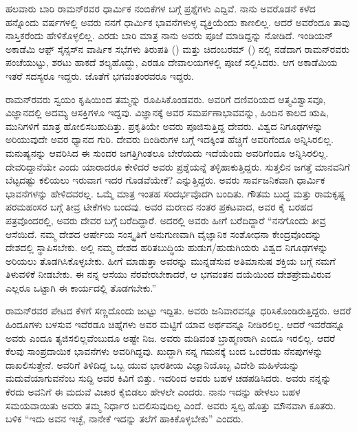 
ಹಲವಾರು ಬಾರಿ ರಾಮನ್‍ರವರ ಧಾರ್ಮಿಕ ನಂಬಿಕೆಗಳ ಬಗ್ಗೆ ಪ್ರಶ್ನೆಗಳು ಎದ್ದಿವೆ. ನಾನು ಅವರೊಡನೆ ಕಳೆದ ಹನ್ನೊಂದು ವರ್ಷಗಳಲ್ಲಿ ಅವರು ನನಗೆ ಧಾರ್ಮಿಕ ಭಾವನೆಗಳುಳ್ಳ ವ್ಯಕ್ತಿಯೆಂದು ಕಾಣಲಿಲ್ಲ. ಆದರೆ ಅವರೆಂದೂ ತಾವು ನಾಸ್ತಿಕರೆಂದು ಹೇಳಿಕೊಳ್ಳಲಿಲ್ಲ. ಎರಡು ಬಾರಿ ಮಾತ್ರ ನಾನು ಅವರು ಪೂಜೆ ಮಾಡಿದ್ದನ್ನು ನೋಡಿದೆ. ಇಂಡಿಯನ್ ಅಕಾಡೆಮಿ ಆಫ಼್ ಸೈನ್ಸಸ್‍ನ ವಾರ್ಷಿಕ ಸಭೆಗಳು ತಿರುಪತಿ () ಮತ್ತು ಚಿದಂಬರಮ್ () ನಲ್ಲಿ ನಡೆದಾಗ ರಾಮನ್‍ರವರು ಪಂಚೆಯುಟ್ಟು, ಶರಟು ಹಾಕದೆ ಶಲ್ಯಹೊದ್ದು, ಎರಡೂ ದೇವಾಲಯಗಳಲ್ಲಿ ಪೂಜೆ ಸಲ್ಲಿಸಿದರು. ಆಗ ಅಕಾಡೆಮಿಯ ಇತರೆ ಸದಸ್ಯರೂ ಇದ್ದರು. ಜೊತೆಗೆ ಭಗವಂತಂರವರೂ ಇದ್ದರು.

ರಾಮನ್‍ರವರು ಸ್ವಯಂ ಕೃಷಿಯಿಂದ ತಮ್ಮನ್ನು ರೂಪಿಸಿಕೊಂಡವರು. ಅವರಿಗೆ ದಣಿವರಿಯದ ಆತ್ಮವಿಶ್ವಾಸವೂ, ವಿಜ್ಞಾನದಲ್ಲಿ ಅದಮ್ಯ ಆಸಕ್ತಿಗಳೂ ಇದ್ದವು. ವಿಜ್ಞಾನಕ್ಕೆ ಅವರ ಸಮರ್ಪಣಾಭಾವವನ್ನು, ಹಿಂದಿನ ಕಾಲದ ಋಷಿ, ಮುನಿಗಳಿಗೆ ಮಾತ್ರ ಹೋಲಿಸಬಹುದಿತ್ತು. ಪ್ರಕೃತಿಯೇ ಅವರು ಪೂಜಿಸುತ್ತಿದ್ದ ದೇವರು. ವಿಶ್ವದ ನಿಗೂಢಗಳನ್ನು ಅರಿಯುವುದೇ ಅವರ ಧ್ಯಾನದ ಗುರಿ. ದೇವರು ದಿಂಡಿರುಗಳ ಬಗ್ಗೆ ಇದಕ್ಕಿಂತ ಹೆಚ್ಚಿಗೆ ಅವರಿಗೆಂದೂ ಅನ್ನಿಸಿರಲಿಲ್ಲ. ಮನುಷ್ಯನನ್ನು ಆವರಿಸಿದ ಈ ಸುಂದರ ಜಗತ್ತಿಗಿಂತಲೂ ಬೇರೆಯದು ಇದೆಯೆಂದು ಅವರಿಗೆಂದೂ ಅನ್ನಿಸಿರಲಿಲ್ಲ. ದೇವರಿದ್ದಾನೆಯೇ ಎಂದು ಯಾರಾದರೂ ಕೇಳಿದರೆ ಅವರು ಪ್ರಶ್ನೆಯನ್ನೆ ತಳ್ಳಿಹಾಕುತ್ತಿದ್ದರು. ಸುತ್ತಲಿನ ಜಗತ್ತೆ ಮಾನವನಿಗೆ ಬೆಟ್ಟದಷ್ಟು ಕಲಿಯಲು ಇರುವಾಗ ಇದರ ಗೊಡವೆಯೇಕೆ? ಎನ್ನುತ್ತಿದ್ದರು. ಅವರು ಸಾರ್ವಜನಿಕವಾಗಿ ಧಾರ್ಮಿಕ ಭಾವನೆಗಳನ್ನು ಹೇಳಿದವರಲ್ಲ. ಒಮ್ಮೆ ಮಾತ್ರ ಇಂತಹ ಸಂದರ್ಭವೊದಗಿ ಬಂದಿತು. ಗೌತಮ ಬುದ್ಧ ಮತ್ತು ರಾಮಕೃಷ್ಣ ಪರಮಹಂಸರ ಬಗ್ಗೆ ತೀವ್ರ ಟೀಕೆಗಳು ಬಂದವು. ಅವರ ಮರಣದ ನಂತರ ಪ್ರಕಟವಾದ, ಅವರ ಕೈ ಬರಹದ ಪತ್ರವೊಂದರಲ್ಲಿ, ಅವರು ದೇವರ ಬಗ್ಗೆ ಬರೆದಿದ್ದಾರೆ. ಅದರಲ್ಲಿ ಅವರು ಹೀಗೆ ಬರೆದಿದ್ದಾರೆ\enginline{--} “ನನಗೊಂದು ತೀವ್ರ ಆಸೆಯಿದೆ. ನಮ್ಮ ದೇಶದ ಆರ್ಷೇಯ ಸಂಸ್ಕೃತಿಗೆ ಅನುಗುಣವಾಗಿ ವೈಜ್ಞಾನಿಕ ಸಂಶೋಧನಾ ಕೇಂದ್ರವೊಂದನ್ನು ದೇಶದಲ್ಲಿ ಸ್ಥಾಪಿಸಬೇಕು. ಅಲ್ಲಿ ನಮ್ಮ ದೇಶದ ಹರಿತಬುದ್ಧಿಯ ಹುಡುಗ/ಹುಡುಗಿಯರು ವಿಶ್ವದ ನಿಗೂಢಗಳನ್ನು ಅರಿಯಲು ತೊಡಗಿಸಿಕೊಳ್ಳಬೇಕು. ಹೀಗೆ ಮಾಡುತ್ತಾ ಅವರನ್ನು ಮುನ್ನಡೆಸುವ ಅತಿಮಾನುಷ ಶಕ್ತಿಯ ಬಗ್ಗೆ ನಮಗೆ ತಿಳುವಳಿಕೆ ನೀಡಬೇಕು. ಈ ನನ್ನ ಆಸೆಯು ನೆರವೇರಬೇಕಾದರೆ, ಆ ಭಗವಂತನ ದಯೆಯಿಂದ ದೇಶಪ್ರೇಮವಿರುವ ಎಲ್ಲರೂ ಒಟ್ಟಾಗಿ ಈ ಕಾರ್ಯದಲ್ಲಿ ತೊಡಗಬೇಕು.”

ರಾಮನ್‍ರವರ ಪೇಟದ ಕೆಳಗೆ ಸಣ್ಣದೊಂದು ಜುಟ್ಟು ಇದ್ದಿತು. ಅವರು ಜನಿವಾರವನ್ನೂ ಧರಿಸಿಕೊಂಡಿರುತ್ತಿದ್ದರು. ಆದರೆ ಹಿಂದೂಗಳು ಬಳಸುವ ಇವೆರಡೂ ಚಿಹ್ನೆಗಳು ಅವರ ಮಟ್ಟಿಗೆ ಯಾವ ಅರ್ಥವನ್ನೂ ನೀಡಿರಲಿಲ್ಲ. ಆದರೆ ಇವರೆಡನ್ನೂ ಅವರು ಎಂದೂ ತ್ಯಜಿಸಲಿಲ್ಲವೆಂಬುದೂ ಅಷ್ಟೇ ನಿಜ. ಅವರು ಮಡಿವಂತ ಬ್ರಾಹ್ಮಣರಾಗಿ ಎಂದೂ ಇರಲಿಲ್ಲ. ಆದರೆ ಕೆಲವು ಸಾಂಪ್ರದಾಯಿಕ ಭಾವನೆಗಳು ಅವರಿಗಿದ್ದವು. ಖುದ್ದಾಗಿ ನನ್ನ ಗಮನಕ್ಕೆ ಬಂದ ಒಂದೆರಡು ನೆನಪುಗಳನ್ನು ದಾಖಲಿಸುತ್ತೇನೆ. ಅವರಿಗೆ ತಿಳಿದಿದ್ದ ಒಬ್ಬ ಯುವ ಭಾರತೀಯ ವಿಜ್ಞಾನಿಯೊಬ್ಬ ವಿದೇಶಿ ಮಹಿಳೆಯನ್ನು ಮದುವೆಯಾಗುವನೆಂಬ ಸುದ್ದಿ ಅವರ ಕಿವಿಗೆ ಬಿತ್ತು. ಇದರಿಂದ ಅವರು ಬಹಳ ಚಡಪಡಿಸಿದರು. ಅವರು ನನ್ನನ್ನು ಕೆರದು ಅವನಿಗೆ ಈ ಮದುವೆ ವಿಚಾರ ಕೈಬಿಡಲು ಹೇಳಲೇ ಎಂದರು. ನಾನು ಇದನ್ನು ಹೇಳಲು ಬಹಳ ಸಮಯವಾಯಿತು ಅವರು ತಮ್ಮ ನಿರ್ಧಾರ ಬದಲಿಸುವುದಿಲ್ಲ ಎಂದೆ. ಅವರು ಸ್ವಲ್ಪ ಹೊತ್ತು ಮೌನವಾಗಿ ಕೂತರು. ಬಳಿಕ “ಇದು ಅವನ ಇಚ್ಛೆ, ನಾನೇಕೆ ಇದನ್ನು ತಲೆಗೆ ಹಾಕಿಕೊಳ್ಳಬೇಕು” ಎಂದರು.

